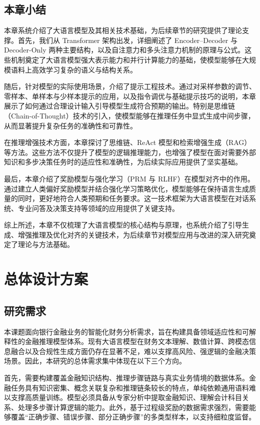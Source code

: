 \documentclass[professional,privacy,print,win,long,STEM,AutoFakeBold]{def/buaa}
\begin{document}
\section{本章小结}

本章系统介绍了大语言模型及其相关技术基础，为后续章节的研究提供了理论支撑。首先，我们从 Transformer 架构出发，详细阐述了 Encoder–Decoder 与 Decoder-Only 两种主要结构，以及自注意力和多头注意力机制的原理与公式。这些机制奠定了大语言模型强大表示能力和并行计算能力的基础，使模型能够在大规模语料上高效学习复杂的语义与结构关系。

随后，针对模型的实际使用场景，介绍了提示工程技术。通过对采样参数的调节、零样本、单样本与少样本提示的应用，以及指令调优与基础提示技巧的说明，本章展示了如何通过合理设计输入引导模型生成符合预期的输出。特别是思维链（Chain-of-Thought）技术的引入，使模型能够在推理任务中显式生成中间步骤，从而显著提升复杂任务的准确性和可靠性。

在推理增强技术方面，本章探讨了思维链、ReAct 模型和检索增强生成（RAG）等方法。这些方法不仅提升了模型的逻辑推理能力，也增强了模型在面对需要外部知识和多步决策任务时的适应性和准确性，为后续实际应用提供了坚实基础。

最后，本章介绍了奖励模型与强化学习（PRM 与 RLHF）在模型对齐中的作用。通过建立人类偏好奖励模型并结合强化学习策略优化，模型能够在保持语言生成质量的同时，更好地符合人类预期和任务要求。这一技术框架为大语言模型在对话系统、专业问答及决策支持等领域的应用提供了关键支持。

综上所述，本章不仅梳理了大语言模型的核心结构与原理，也系统介绍了引导生成、增强推理及优化对齐的关键技术，为后续章节对模型应用与改进的深入研究奠定了理论与方法基础。


\newpage
\chapter{总体设计方案}
\section{研究需求}
本课题面向银行金融业务的智能化财务分析需求，旨在构建具备领域适应性和可解释性的金融推理模型体系。现有大语言模型在财务文本理解、数值计算、跨模态信息融合以及合规性生成方面仍存在显著不足，难以支撑高风险、强逻辑的金融决策场景。因此，本研究的总体需求集中体现在以下三个方向。

首先，需要构建覆盖金融知识结构、推理步骤链路与真实业务情境的数据体系。金融任务具有知识密集、概念关联复杂和推理链条较长的特点，单纯依赖通用语料难以支撑高质量训练。模型必须具备从专家分析中提取金融知识、理解会计科目关系、处理多步骤计算逻辑的能力。此外，基于过程级奖励的数据需求强烈，需要能够覆盖“正确步骤、错误步骤、部分正确步骤”的多类型样本，以支持细粒度监督。
\end{document}
